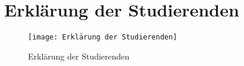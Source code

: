 \section{Erklärung der Studierenden}

\begin{figure}[H]
	\texttt{[image: Erklärung der Studierenden]}
	\caption{Erklärung der Studierenden}
	\label{fig:Erklärung}
\end{figure}
